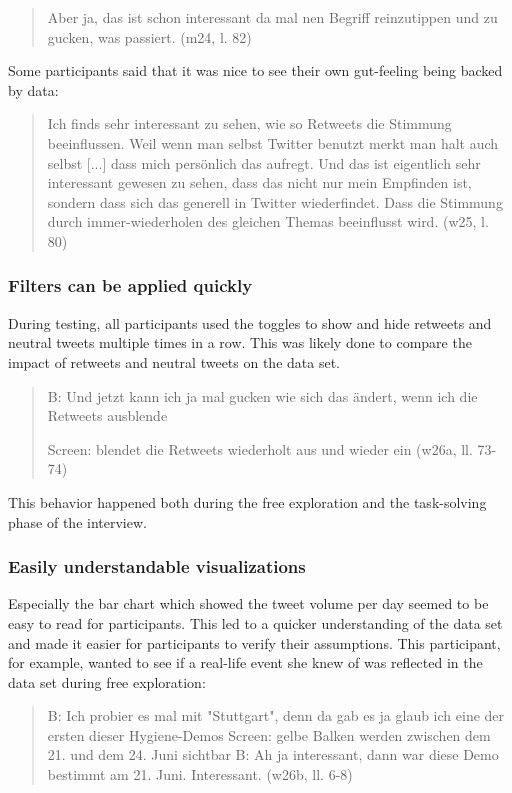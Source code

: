 \begin{quote}
    Aber ja, das ist schon interessant da mal nen Begriff reinzutippen und zu gucken, was passiert. (m24, l. 82)
\end{quote}

Some participants said that it was nice to see their own gut-feeling being backed by data:

\begin{quote}
    Ich finds sehr interessant zu sehen, wie so Retweets die Stimmung beeinflussen. Weil wenn man selbst Twitter benutzt merkt man halt auch selbst [...] dass mich persönlich das aufregt. Und das ist eigentlich sehr interessant gewesen zu sehen, dass das nicht nur mein Empfinden ist, sondern dass sich das generell in Twitter wiederfindet. Dass die Stimmung durch immer-wiederholen des gleichen Themas beeinflusst wird. (w25, l. 80)
\end{quote}

\subsubsection*{Filters can be applied quickly}
During testing, all participants used the toggles to show and hide retweets and neutral tweets multiple times in a row. This was likely done to compare the impact of retweets and neutral tweets on the data set.

\begin{quote}
    B: Und jetzt kann ich ja mal gucken wie sich das ändert, wenn ich die Retweets ausblende

    Screen: blendet die Retweets wiederholt aus und wieder ein (w26a, ll. 73-74)
\end{quote}

This behavior happened both during the free exploration and the task-solving phase of the interview.

\subsubsection*{Easily understandable visualizations}
Especially the bar chart which showed the tweet volume per day seemed to be easy to read for participants. This led to a quicker understanding of the data set and made it easier for participants to verify their assumptions. This participant, for example, wanted to see if a real-life event she knew of was reflected in the data set during free exploration:

\begin{quote}
    B: Ich probier es mal mit "Stuttgart", denn da gab es ja glaub ich eine der ersten dieser Hygiene-Demos
    Screen: gelbe Balken werden zwischen dem 21. und dem 24. Juni sichtbar
    B: Ah ja interessant, dann war diese Demo bestimmt am 21. Juni. Interessant. (w26b, ll. 6-8)
\end{quote}

